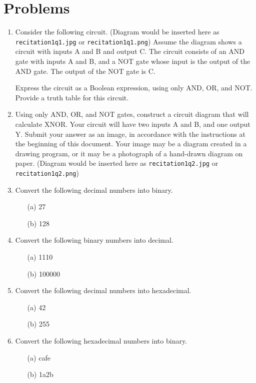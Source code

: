 \documentclass{article}
\begin{document}
\section*{Problems}
\begin{enumerate}
    \item Consider the following circuit.  (Diagram would be inserted here as \texttt{recitation1q1.jpg} or \texttt{recitation1q1.png})  Assume the diagram shows a circuit with inputs A and B and output C. The circuit consists of an AND gate with inputs A and B, and a NOT gate whose input is the output of the AND gate. The output of the NOT gate is C.

    Express the circuit as a Boolean expression, using only AND, OR, and NOT. Provide a truth table for this circuit.

    \item Using only AND, OR, and NOT gates, construct a circuit diagram that will calculate XNOR. Your circuit will have two inputs A and B, and one output Y.
    Submit your answer as an image, in accordance with the instructions at the beginning of this document. Your image may be a diagram created in a drawing program, or it may be a photograph of a hand-drawn diagram on paper. (Diagram would be inserted here as \texttt{recitation1q2.jpg} or \texttt{recitation1q2.png})

    \item Convert the following decimal numbers into binary.
    \begin{itemize}
        \item[(a)] 27
        \item[(b)] 128
    \end{itemize}

    \item Convert the following binary numbers into decimal.
    \begin{itemize}
        \item[(a)] 1110
        \item[(b)] 100000
    \end{itemize}

    \item Convert the following decimal numbers into hexadecimal.
    \begin{itemize}
        \item[(a)] 42
        \item[(b)] 255
    \end{itemize}

    \item Convert the following hexadecimal numbers into binary.
    \begin{itemize}
        \item[(a)] cafe
        \item[(b)] 1a2b
    \end{itemize}


\end{enumerate}
\end{document}

